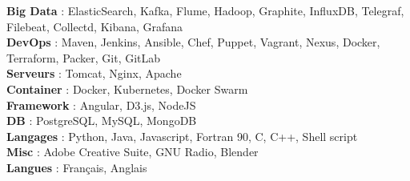 
\begin{cvparagraph}

\textbf{Big Data} : ElasticSearch, Kafka, Flume, Hadoop, Graphite, InfluxDB, Telegraf, Filebeat, Collectd, Kibana, Grafana \\
\textbf{DevOps} : Maven, Jenkins, Ansible, Chef, Puppet, Vagrant, Nexus, Docker, Terraform, Packer, Git, GitLab \\
\textbf{Serveurs} : Tomcat, Nginx, Apache \\
\textbf{Container} : Docker, Kubernetes, Docker Swarm \\
\textbf{Framework} : Angular, D3.js, NodeJS \\
\textbf{DB} : PostgreSQL, MySQL, MongoDB \\
\textbf{Langages} : Python, Java, Javascript, Fortran 90, C, C++, Shell script \\
\textbf{Misc} : Adobe Creative Suite, GNU Radio, Blender \\
\textbf{Langues} : Fran\c cais, Anglais 
\end{cvparagraph}
